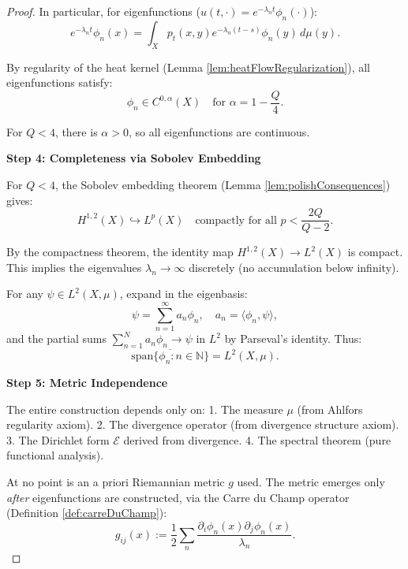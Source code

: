 \begin{proof}
In particular, for eigenfunctions ($u(t, \cdot) = e^{-\lambda_n t} \phi_n(\cdot)$):
\begin{equation}
e^{-\lambda_n t} \phi_n(x) = \int_X p_t(x, y) e^{-\lambda_n(t-s)} \phi_n(y) \, d\mu(y).
\end{equation}

By regularity of the heat kernel (Lemma \ref{lem:heatFlowRegularization}), all eigenfunctions satisfy:
\begin{equation}
\phi_n \in C^{0, \alpha}(X) \quad \text{for } \alpha = 1 - \frac{Q}{4}.
\end{equation}

For $Q < 4$, there is $\alpha > 0$, so all eigenfunctions are continuous.

\textbf{Step 4: Completeness via Sobolev Embedding}

For $Q < 4$, the Sobolev embedding theorem (Lemma \ref{lem:polishConsequences}) gives:
\begin{equation}
H^{1,2}(X) \hookrightarrow L^p(X) \quad \text{compactly for all } p < \frac{2Q}{Q-2}.
\end{equation}

By the \cite{biroli2000embedding} compactness theorem, the identity map $H^{1,2}(X) \to L^2(X)$ is compact. This implies the eigenvalues $\lambda_n \to \infty$ discretely (no accumulation below infinity).

For any $\psi \in L^2(X, \mu)$, expand in the eigenbasis:
\begin{equation}
\psi = \sum_{n=1}^\infty a_n \phi_n, \quad a_n = \langle \phi_n, \psi \rangle,
\end{equation}
and the partial sums $\sum_{n=1}^N a_n \phi_n \to \psi$ in $L^2$ by Parseval's identity. Thus:
\begin{equation}
\overline{\text{span}\{\phi_n : n \in \mathbb{N}\}} = L^2(X, \mu).
\end{equation}

\textbf{Step 5: Metric Independence}

The entire construction depends only on:
1. The measure $\mu$ (from Ahlfors regularity axiom).
2. The divergence operator (from divergence structure axiom).
3. The Dirichlet form $\mathcal{E}$ derived from divergence.
4. The spectral theorem (pure functional analysis).

At no point is an a priori Riemannian metric $g$ used. The metric emerges only \textit{after} eigenfunctions are constructed, via the Carre du Champ operator (Definition \ref{def:carreDuChamp}):
\begin{equation}
g_{ij}(x) := \frac{1}{2} \sum_n \frac{\partial_i \phi_n(x) \partial_j \phi_n(x)}{\lambda_n}.
\end{equation}


\end{proof}
